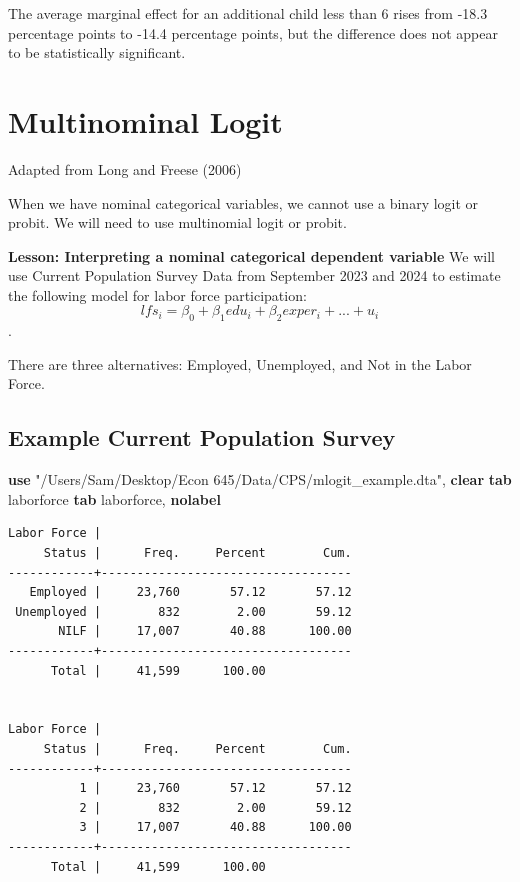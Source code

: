 \documentclass[
]{book}
\newenvironment{Shaded}{\begin{snugshade}}{\end{snugshade}}
\newcommand{\KeywordTok}[1]{\textcolor[rgb]{0.13,0.29,0.53}{\textbf{#1}}}
\newcommand{\NormalTok}[1]{#1}
\newcommand{\StringTok}[1]{\textcolor[rgb]{0.31,0.60,0.02}{#1}}
\begin{document}
The average marginal effect for an additional child less than 6 rises from -18.3 percentage points to -14.4 percentage points, but the difference does not appear to be statistically significant.

\chapter{Multinominal Logit}\label{multinominal-logit}

Adapted from Long and Freese (2006)

When we have nominal categorical variables, we cannot use a binary logit or probit. We will need to use multinomial logit or probit.

\textbf{Lesson: Interpreting a nominal categorical dependent variable}
We will use Current Population Survey Data from September 2023 and 2024 to estimate the following model for labor force participation:
\[ lfs_{i}=\beta_{0}+\beta_1 edu_{i} + \beta_2 exper_i + ... + u_i \].

There are three alternatives: Employed, Unemployed, and Not in the Labor Force.

\section{Example Current Population Survey}\label{example-current-population-survey}

\begin{Shaded}
\begin{Highlighting}[]
\KeywordTok{use} \StringTok{"/Users/Sam/Desktop/Econ 645/Data/CPS/mlogit\_example.dta"}\NormalTok{, }\KeywordTok{clear}
\KeywordTok{tab}\NormalTok{ laborforce}
\KeywordTok{tab}\NormalTok{ laborforce, }\KeywordTok{nolabel}
\end{Highlighting}
\end{Shaded}

\begin{verbatim}
Labor Force |
     Status |      Freq.     Percent        Cum.
------------+-----------------------------------
   Employed |     23,760       57.12       57.12
 Unemployed |        832        2.00       59.12
       NILF |     17,007       40.88      100.00
------------+-----------------------------------
      Total |     41,599      100.00


Labor Force |
     Status |      Freq.     Percent        Cum.
------------+-----------------------------------
          1 |     23,760       57.12       57.12
          2 |        832        2.00       59.12
          3 |     17,007       40.88      100.00
------------+-----------------------------------
      Total |     41,599      100.00
\end{verbatim}
\end{document}
